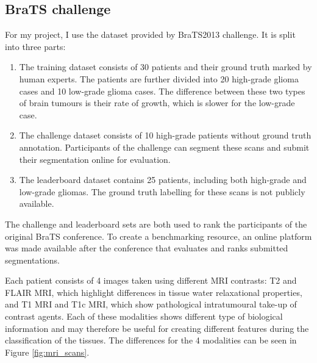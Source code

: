 \documentclass[12pt,a4paper,twoside,openright]{report}
\begin{document}
\subsection{BraTS challenge}
For my project, I use the dataset provided by BraTS2013\cite{menze:hal-00935640} challenge. It is split into three parts:
\begin{enumerate}
	\item The training dataset consists of 30 patients and their ground truth marked by human experts. The patients are further divided into 20 high-grade glioma cases and 10 low-grade glioma cases. The difference between these two types of brain tumours is their rate  of growth, which is slower for the low-grade case.
	\item The challenge dataset consists of 10 high-grade patients without ground truth annotation. Participants of the challenge can segment these scans and submit their segmentation online for evaluation. 	
	\item The leaderboard dataset contains 25 patients, including both high-grade and low-grade gliomas. The ground truth labelling for these scans is not publicly available.
\end{enumerate}
The challenge and leaderboard sets are both used to rank the participants of the original BraTS conference. To create a benchmarking resource, an online platform was made available after the conference that evaluates and ranks submitted segmentations.

Each patient consists of 4 images taken using different MRI contrasts: T2 and FLAIR MRI, which highlight differences in tissue water relaxational properties, and T1 MRI and T1c MRI, which show pathological intratumoural take-up of contrast agents. Each of these modalities shows different type of biological information and may therefore be useful for creating different features during the classification of the tissues. The differences for the 4 modalities can be seen in Figure \ref{fig:mri_scans}. 
\end{document}
